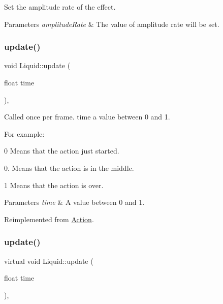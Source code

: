 Set the amplitude rate of the effect. 


\begin{DoxyParams}{Parameters}
{\em amplitude\+Rate} & The value of amplitude rate will be set. \\
\hline
\end{DoxyParams}
\mbox{\label{classLiquid_af8fb9abd724ae6ea4ff9db4b07421c61}} 
\subsubsection{\texorpdfstring{update()}{update()}\hspace{0.1cm}{\footnotesize\ttfamily [1/2]}}
{\footnotesize\ttfamily void Liquid\+::update (\begin{DoxyParamCaption}\item[{float}]{time }\end{DoxyParamCaption})\hspace{0.3cm}{\ttfamily [override]}, {\ttfamily [virtual]}}

Called once per frame. time a value between 0 and 1.

For example\+:
\begin{DoxyItemize}
\item 0 Means that the action just started.
\item 0. Means that the action is in the middle.
\item 1 Means that the action is over.
\end{DoxyItemize}


\begin{DoxyParams}{Parameters}
{\em time} & A value between 0 and 1. \\
\hline
\end{DoxyParams}


Reimplemented from \hyperlink{classAction_a937e646e63915e33ad05ba149bfcf239}{Action}.

\mbox{\label{classLiquid_a30119c518173d6edab4307a9ea481b0f}} 
\subsubsection{\texorpdfstring{update()}{update()}\hspace{0.1cm}{\footnotesize\ttfamily [2/2]}}
{\footnotesize\ttfamily virtual void Liquid\+::update (\begin{DoxyParamCaption}\item[{float}]{time }\end{DoxyParamCaption})\hspace{0.3cm}{\ttfamily [override]}, {\ttfamily [virtual]}}

